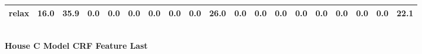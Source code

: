 \documentclass{article}
\begin{document}
\begin{sideways}
\begin{tabular}{lrrrrrrrrrrrrrrrrrr}
relax                         &        16.0 &               35.9 &           0.0 &                          0.0 &                0.0 &                0.0 &                        0.0 &          0.0 &             26.0 &                0.0 &                    0.0 &                      0.0 &                  0.0 &                   0.0 &              0.0 &              0.0 &                                  0.0 &         22.1 \\
\bottomrule
\end{tabular}
\end{sideways}
\normalsize
\vspace{1cm}\\
\textbf{House C Model CRF Feature Last}\\
\vspace{1cm}\\
\end{document}
